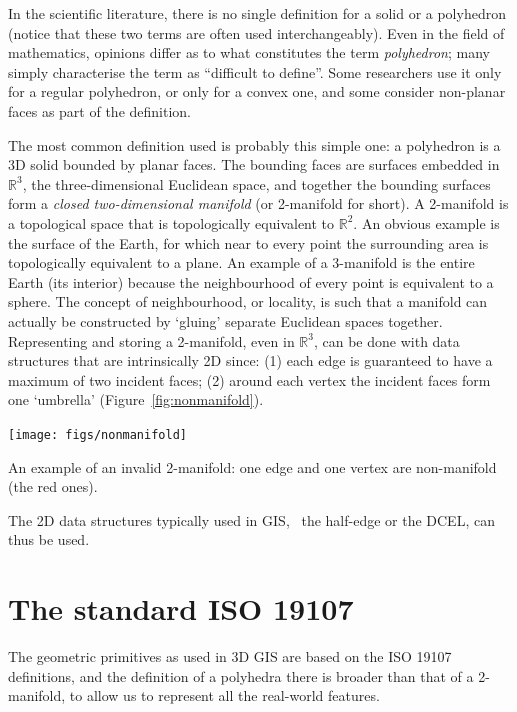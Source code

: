In the scientific literature, there is no single definition for a solid or a polyhedron (notice that these two terms are often used interchangeably).
Even in the field of mathematics, opinions differ as to what constitutes the term \emph{polyhedron}; many simply characterise the term as ``difficult to define''. 
Some researchers use it only for a regular polyhedron, or only for a convex one, and some consider non-planar faces as part of the definition.

%

The most common definition used is probably this simple one: a polyhedron is a 3D solid bounded by planar faces. 
The bounding faces are surfaces embedded in $\mathbb{R}^3$, the three-dimen\-si\-o\-nal Euclidean space, and together the bounding surfaces form a \emph{closed two-dimensional manifold} (or 2-manifold for short).
A 2-manifold is a topological space that is topologically equivalent to $\mathbb{R}^2$. 
An obvious example is the surface of the Earth, for which near to every point the surrounding area is topologically equivalent to a plane. 
An example of a 3-manifold is the entire Earth (its interior) because the neighbourhood of every point is equivalent to a sphere. 
The concept of neighbourhood, or locality, is such that a manifold can actually be constructed by `gluing' separate Euclidean spaces together.
Representing and storing a 2-manifold, even in $\mathbb{R}^3$, can be done with data structures that are intrinsically 2D since: (1) each edge is guaranteed to have a maximum of two incident faces; (2) around each vertex the incident faces form one `umbrella' (Figure~\ref{fig:nonmanifold}).
\begin{marginfigure}
  \centering
  \texttt{[image: figs/nonmanifold]}
  \caption{An example of an invalid 2-manifold: one edge and one vertex are non-manifold (the red ones).}%
\label{fig:nonmanifold}
\end{marginfigure}
The 2D data structures typically used in GIS, \eg\ the half-edge or the DCEL, can thus be used.



%
\section{The standard ISO 19107}

The geometric primitives as used in 3D GIS are based on the ISO 19107 definitions, and the definition of a polyhedra there is broader than that of a 2-manifold, to allow us to represent all the real-world features.

